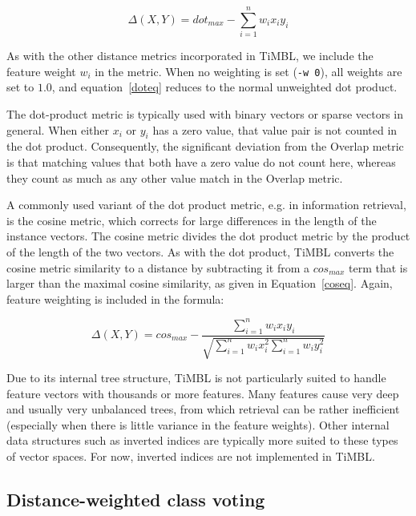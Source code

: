 \documentclass{report}
\begin{document}
\begin{equation}
\label{doteq}
\Delta(X,Y) = dot_{max} - \sum_{i=1}^{n} w_{i} x_{i} y_{i}
\end{equation}

As with the other distance metrics incorporated in TiMBL, we include
the feature weight $w_{i}$ in the metric. When no weighting is set
({\tt -w 0}), all weights are set to $1.0$, and equation~\ref{doteq}
reduces to the normal unweighted dot product.

The dot-product metric is typically used with binary vectors or sparse 
vectors in general. When either $x_{i}$ or $y_{i}$ has a zero value, that 
value pair is not counted in the dot product. Consequently, the significant 
deviation from the Overlap metric is that matching values that both have a 
zero value do not count here, whereas they count as much as any other value 
match in the Overlap metric.

A commonly used variant of the dot product metric, e.g. in information
retrieval, is the cosine metric, which corrects for large differences
in the length of the instance vectors. The cosine metric divides the
dot product metric by the product of the length of the two vectors. As
with the dot product, TiMBL converts the cosine metric similarity to a
distance by subtracting it from a $cos_{max}$ term that is larger than
the maximal cosine similarity, as given in
Equation~\ref{coseq}. Again, feature weighting is included in the
formula:

\begin{equation}
\label{coseq}
\Delta(X,Y) = cos_{max} - \frac{\sum_{i=1}^{n} w_{i} x_{i} y_{i}}{\sqrt{\sum_{i=1}^{n} w_{i} x_{i}^2 \sum_{i=1}^{n} w_{i} y_{i}^2}}
\end{equation}

Due to its internal tree structure, TiMBL is not particularly suited
to handle feature vectors with thousands or more features. Many features
cause very deep and usually very unbalanced trees, from which
retrieval can be rather inefficient (especially when there is little
variance in the feature weights). Other internal data structures such as
inverted indices are typically more suited to these types of vector
spaces. For now, inverted indices are not implemented in TiMBL.

\subsection{Distance-weighted class voting}
\label{distweightvote}
\end{document}
